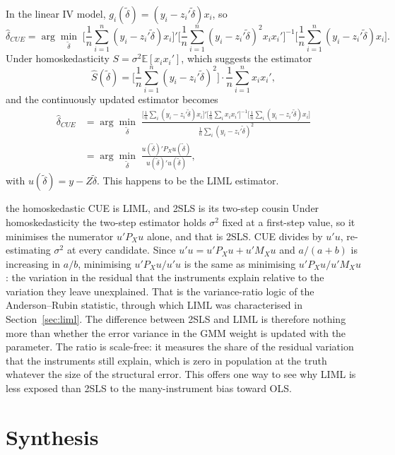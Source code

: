 \documentclass[11pt,a4paper]{article}
\newcommand{\E}{\mathbb{E}}
\newcommand{\dhat}{\hat\delta}
\begin{document}
In the linear IV model, $g_i(\tilde\delta)=(y_i-z_i'\tilde\delta)x_i$, so
\[
\dhat_{CUE}=\arg\min_{\tilde\delta}\;\Big[\frac1n\sum_{i=1}^n(y_i-z_i'\tilde\delta)x_i\Big]'\Big[\frac1n\sum_{i=1}^n(y_i-z_i'\tilde\delta)^2x_ix_i'\Big]^{-1}\Big[\frac1n\sum_{i=1}^n(y_i-z_i'\tilde\delta)x_i\Big].
\]
Under homoskedasticity $S=\sigma^2\E[x_ix_i']$, which suggests the estimator
\[
\hat S(\tilde\delta)=\Big[\frac1n\sum_{i=1}^n(y_i-z_i'\tilde\delta)^2\Big]\cdot\frac1n\sum_{i=1}^nx_ix_i',
\]
and the continuously updated estimator becomes
\begin{equation}\label{eq:cueliml}
\begin{aligned}
\dhat_{CUE}&=\arg\min_{\tilde\delta}\;\frac{\big[\frac1n\sum_i(y_i-z_i'\tilde\delta)x_i\big]'\big[\frac1n\sum_ix_ix_i'\big]^{-1}\big[\frac1n\sum_i(y_i-z_i'\tilde\delta)x_i\big]}{\frac1n\sum_i(y_i-z_i'\tilde\delta)^2}\\[4pt]
&=\arg\min_{\tilde\delta}\;\frac{u(\tilde\delta)'P_Xu(\tilde\delta)}{u(\tilde\delta)'u(\tilde\delta)},
\end{aligned}
\end{equation}
with $u(\tilde\delta)=y-Z\tilde\delta$. This happens to be the LIML estimator.

\begin{whybox}{the homoskedastic CUE is LIML, and 2SLS is its two-step cousin}
Under homoskedasticity the two-step estimator holds $\sigma^2$ fixed at a first-step value, so it minimises the numerator $u'P_Xu$ alone, and that is 2SLS. CUE divides by $u'u$, re-estimating $\sigma^2$ at every candidate. Since $u'u=u'P_Xu+u'M_Xu$ and $a/(a+b)$ is increasing in $a/b$, minimising $u'P_Xu/u'u$ is the same as minimising $u'P_Xu/u'M_Xu$: the variation in the residual that the instruments explain relative to the variation they leave unexplained. That is the variance-ratio logic of the Anderson--Rubin statistic, through which LIML was characterised in Section~\ref{sec:liml}. The difference between 2SLS and LIML is therefore nothing more than whether the error variance in the GMM weight is updated with the parameter. The ratio is scale-free: it measures the share of the residual variation that the instruments still explain, which is zero in population at the truth whatever the size of the structural error. This offers one way to see why LIML is less exposed than 2SLS to the many-instrument bias toward OLS.
\end{whybox}

\section{Synthesis}\label{sec:synth}
\end{document}
